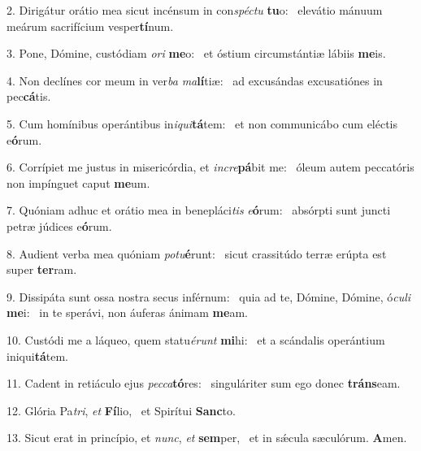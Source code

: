2. Dirigátur orátio mea sicut incénsum in con\textit{spéc}\textit{tu} \textbf{tu}o: \ast\  elevátio mánuum meárum sacrifícium vesper\textbf{tí}num.\

3. Pone, Dómine, custódiam \textit{o}\textit{ri} \textbf{me}o: \ast\  et óstium circumstántiæ lábiis \textbf{me}is.\

4. Non declínes cor meum in ver\textit{ba} \textit{ma}\textbf{lí}tiæ: \ast\  ad excusándas excusatiónes in pec\textbf{cá}tis.\

5. Cum homínibus operántibus in\textit{i}\textit{qui}\textbf{tá}tem: \ast\  et non communicábo cum eléctis e\textbf{ó}rum.\

6. Corrípiet me justus in misericórdia, et \textit{in}\textit{cre}\textbf{pá}bit me: \ast\  óleum autem peccatóris non impínguet caput \textbf{me}um.\

7. Quóniam adhuc et orátio mea in benepláci\textit{tis} \textit{e}\textbf{ó}rum: \ast\  absórpti sunt juncti petræ júdices e\textbf{ó}rum.\

8. Audient verba mea quóniam \textit{pot}\textit{u}\textbf{é}runt: \ast\  sicut crassitúdo terræ erúpta est super \textbf{ter}ram.\

9. Dissipáta sunt ossa nostra secus inférnum: \dag\  quia ad te, Dómine, Dómine, ó\textit{cu}\textit{li} \textbf{me}i: \ast\  in te sperávi, non áuferas ánimam \textbf{me}am.\

10. Custódi me a láqueo, quem statu\textit{é}\textit{runt} \textbf{mi}hi: \ast\  et a scándalis operántium iniqui\textbf{tá}tem.\

11. Cadent in retiáculo ejus \textit{pec}\textit{ca}\textbf{tó}res: \ast\  singuláriter sum ego donec \textbf{tráns}eam.\

12. Glória Pa\textit{tri}, \textit{et} \textbf{Fí}lio, \ast\  et Spirítui \textbf{Sanc}to.\

13. Sicut erat in princípio, et \textit{nunc}, \textit{et} \textbf{sem}per, \ast\  et in sǽcula sæculórum. \textbf{A}men.\

